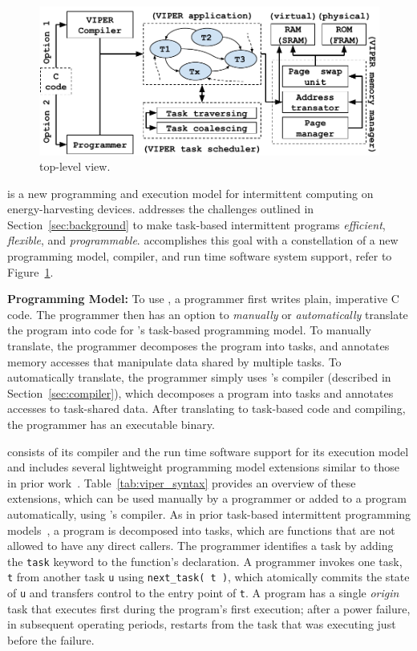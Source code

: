 \begin{figure}
	\centering
	\includegraphics[width=\columnwidth]{figures/viper_block_diagram.pdf}
	\caption{\sys top-level view.}
	\label{fig:system_overview}
\end{figure}

\sys is a new programming and execution model for intermittent computing on energy-harvesting devices. \sys addresses the challenges outlined in Section~\ref{sec:background} to make task-based intermittent programs {\em efficient}, {\em flexible}, and {\em programmable}. \sys accomplishes this goal with a constellation of a new programming model, compiler, and run time software system support, refer to Figure~\ref{fig:system_overview}.

\noindent \textbf{\sys Programming Model:} To use \sys, a programmer first writes plain, imperative C code. The programmer then has an option to {\em manually} or {\em automatically} translate the program into code for \sys's task-based programming model. To manually translate, the programmer decomposes the program into tasks, and annotates memory accesses that manipulate data shared by multiple tasks. To automatically translate, the programmer simply uses \sys's compiler (described in Section~\ref{sec:compiler}), which decomposes a program into tasks and annotates accesses to task-shared data. After translating to task-based code and compiling, the programmer has an executable \sys binary.

\sys consists of its compiler and the run time software support for its execution model and includes several lightweight programming model extensions similar to those in prior work~\cite{chain,alpaca}. Table~\ref{tab:viper_syntax} provides an overview of these extensions, which can be used manually by a programmer or added to a program automatically, using \sys's compiler. As in prior task-based intermittent programming models~\cite{chain,alpaca}, a \sys program is decomposed into tasks, which are functions that are not allowed to have any direct callers. The programmer identifies a task by adding the {\tt task} keyword to the function's declaration. A programmer invokes one task, {\tt t} from another task {\tt u} using {\tt next\_task( t )}, which atomically commits the state of {\tt u} and transfers control to the entry point of {\tt t}. A program has a single {\em origin} task that executes first during the program's first execution; after a power failure, in subsequent operating periods, \sys restarts from the task that was executing just before the failure.

